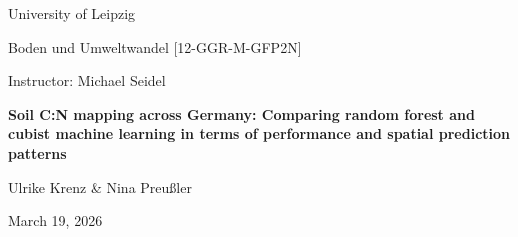 \begin{titlepage}
\centering

{\Large University of Leipzig \par}
\vspace{1.5cm}

{\Large Boden und Umweltwandel [12-GGR-M-GFP2N] \par}
\vspace{0.3cm}

{\Large Instructor: Michael Seidel \par}
\vspace{2cm}

{\huge \textbf{Soil C:N mapping across Germany: Comparing random forest and cubist machine learning in terms of performance and spatial prediction patterns} \par}
\vspace{2cm}

{\Large Ulrike Krenz \& Nina Preußler
 \par}
\vspace{1cm}

{\Large March 19, 2026 \par}

\vfill

\end{titlepage}

\tableofcontents
\newpage
